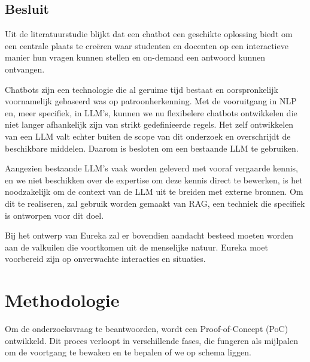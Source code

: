 \subsection{Besluit}

Uit de literatuurstudie blijkt dat een chatbot een geschikte oplossing biedt om een centrale plaats te creëren waar studenten en docenten op een interactieve manier hun vragen kunnen stellen en on-demand een antwoord kunnen ontvangen.

Chatbots zijn een technologie die al geruime tijd bestaat en oorspronkelijk voornamelijk gebaseerd was op patroonherkenning. Met de vooruitgang in NLP en, meer specifiek, in LLM's, kunnen we nu flexibelere chatbots ontwikkelen die niet langer afhankelijk zijn van strikt gedefinieerde regels. Het zelf ontwikkelen van een LLM valt echter buiten de scope van dit onderzoek en overschrijdt de beschikbare middelen. Daarom is besloten om een bestaande LLM te gebruiken.

Aangezien bestaande LLM's vaak worden geleverd met vooraf vergaarde kennis, en we niet beschikken over de expertise om deze kennis direct te bewerken, is het noodzakelijk om de context van de LLM uit te breiden met externe bronnen. Om dit te realiseren, zal gebruik worden gemaakt van RAG, een techniek die specifiek is ontworpen voor dit doel.

Bij het ontwerp van Eureka zal er bovendien aandacht besteed moeten worden aan de valkuilen die voortkomen uit de menselijke natuur. Eureka moet voorbereid zijn op onverwachte interacties en situaties.

\section{Methodologie}%
\label{sec:methodologie}

Om de onderzoeksvraag te beantwoorden, wordt een Proof-of-Concept (PoC) ontwikkeld. Dit proces verloopt in verschillende fases, die fungeren als mijlpalen om de voortgang te bewaken en te bepalen of we op schema liggen.


